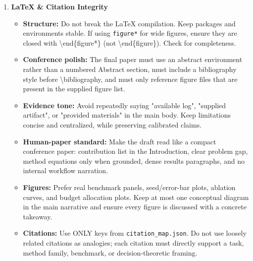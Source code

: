 \begin{enumerate}
    \item \textbf{LaTeX \& Citation Integrity}
    \begin{itemize}
    \item \textbf{Structure:} Do not break the LaTeX compilation. Keep packages and environments stable. If using \texttt{figure*} for wide figures, ensure they are closed with \textbackslash{}end\{figure*\} (not \textbackslash{}end\{figure\}). Check for completeness.
    \item \textbf{Conference polish:} The final paper must use an abstract environment rather than a numbered Abstract section, must include a bibliography style before \textbackslash{}bibliography, and must only reference figure files that are present in the supplied figure list.
    \item \textbf{Evidence tone:} Avoid repeatedly saying "available log", "supplied artifact", or "provided materials" in the main body. Keep limitations concise and centralized, while preserving calibrated claims.
    \item \textbf{Human-paper standard:} Make the draft read like a compact conference paper: contribution list in the Introduction, clear problem gap, method equations only when grounded, dense results paragraphs, and no internal workflow narration.
    \item \textbf{Figures:} Prefer real benchmark panels, seed/error-bar plots, ablation curves, and budget allocation plots. Keep at most one conceptual diagram in the main narrative and ensure every figure is discussed with a concrete takeaway.
        \item \textbf{Citations:} Use ONLY keys from \texttt{citation\_map.json}. Do not use loosely related citations as analogies; each citation must directly support a task, method family, benchmark, or decision-theoretic framing.
    \end{itemize}


\end{enumerate}
